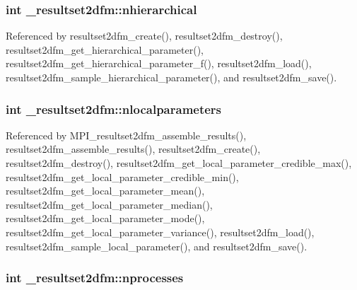 \subsubsection[{\texorpdfstring{nhierarchical}{nhierarchical}}]{\setlength{\rightskip}{0pt plus 5cm}int \+\_\+resultset2dfm\+::nhierarchical}\hypertarget{struct__resultset2dfm_a2f12e36554699e39baacb231597f5c88}{}\label{struct__resultset2dfm_a2f12e36554699e39baacb231597f5c88}


Referenced by resultset2dfm\+\_\+create(), resultset2dfm\+\_\+destroy(), resultset2dfm\+\_\+get\+\_\+hierarchical\+\_\+parameter(), resultset2dfm\+\_\+get\+\_\+hierarchical\+\_\+parameter\+\_\+f(), resultset2dfm\+\_\+load(), resultset2dfm\+\_\+sample\+\_\+hierarchical\+\_\+parameter(), and resultset2dfm\+\_\+save().

\subsubsection[{\texorpdfstring{nlocalparameters}{nlocalparameters}}]{\setlength{\rightskip}{0pt plus 5cm}int \+\_\+resultset2dfm\+::nlocalparameters}\hypertarget{struct__resultset2dfm_ae7d70d65213bc9877b3a2cbd08ae9b87}{}\label{struct__resultset2dfm_ae7d70d65213bc9877b3a2cbd08ae9b87}


Referenced by M\+P\+I\+\_\+resultset2dfm\+\_\+assemble\+\_\+results(), resultset2dfm\+\_\+assemble\+\_\+results(), resultset2dfm\+\_\+create(), resultset2dfm\+\_\+destroy(), resultset2dfm\+\_\+get\+\_\+local\+\_\+parameter\+\_\+credible\+\_\+max(), resultset2dfm\+\_\+get\+\_\+local\+\_\+parameter\+\_\+credible\+\_\+min(), resultset2dfm\+\_\+get\+\_\+local\+\_\+parameter\+\_\+mean(), resultset2dfm\+\_\+get\+\_\+local\+\_\+parameter\+\_\+median(), resultset2dfm\+\_\+get\+\_\+local\+\_\+parameter\+\_\+mode(), resultset2dfm\+\_\+get\+\_\+local\+\_\+parameter\+\_\+variance(), resultset2dfm\+\_\+load(), resultset2dfm\+\_\+sample\+\_\+local\+\_\+parameter(), and resultset2dfm\+\_\+save().

\subsubsection[{\texorpdfstring{nprocesses}{nprocesses}}]{\setlength{\rightskip}{0pt plus 5cm}int \+\_\+resultset2dfm\+::nprocesses}\hypertarget{struct__resultset2dfm_ad178d8e2517deb7b5cfea4ffd22561be}{}\label{struct__resultset2dfm_ad178d8e2517deb7b5cfea4ffd22561be}


